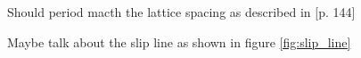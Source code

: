 











Should period macth the lattice spacing as described in \cite{kim_nano-scale_2009}[p. 144]



Maybe talk about the slip line as shown in figure \ref{fig:slip_line}



